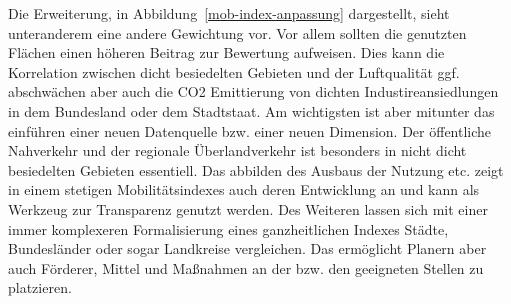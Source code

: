 Die Erweiterung, in Abbildung~\ref{mob-index-anpassung} dargestellt, sieht unteranderem eine andere Gewichtung vor. Vor allem sollten die genutzten Flächen einen höheren Beitrag zur Bewertung aufweisen. Dies kann die Korrelation zwischen dicht besiedelten Gebieten und der Luftqualität ggf. abschwächen aber auch die CO2 Emittierung von dichten Industireansiedlungen in dem Bundesland oder dem Stadtstaat.
Am wichtigsten ist aber mitunter das einführen einer neuen Datenquelle bzw. einer neuen Dimension. Der öffentliche Nahverkehr und der regionale Überlandverkehr ist besonders in nicht dicht besiedelten Gebieten essentiell.
Das abbilden des Ausbaus der Nutzung etc. zeigt in einem stetigen Mobilitätsindexes auch deren Entwicklung an und kann als Werkzeug zur Transparenz genutzt werden.
Des Weiteren lassen sich mit einer immer komplexeren Formalisierung eines ganzheitlichen Indexes Städte, Bundesländer oder sogar Landkreise vergleichen. Das ermöglicht Planern aber auch Förderer, Mittel und Maßnahmen an der bzw. den geeigneten Stellen zu platzieren.






